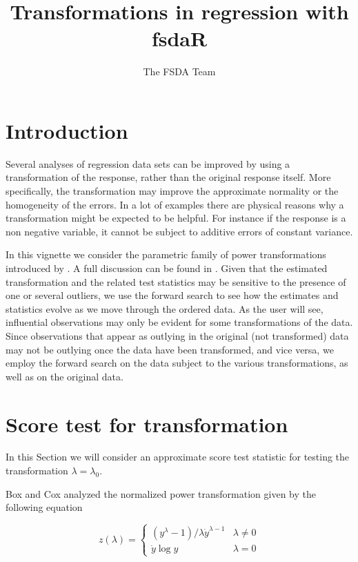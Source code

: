 \documentclass[article,shortnames,nojss]{jss}
\author{The FSDA Team}
\title{Transformations in regression with fsdaR}
\begin{document}

\section[Introduction]{Introduction}
Several analyses of regression data sets can be improved by using a transformation of the response, rather than the original response itself. More specifically, the transformation may improve the approximate normality or the homogeneity of the errors. In a lot of examples there are physical reasons why a transformation might be expected to be helpful. For instance if the response is a non negative variable, it cannot be subject to additive errors of constant variance.

In this vignette we consider the parametric family of power transformations introduced by \citet{box:1964}. A full discussion can be found in \citet{atkinson:2000}. Given that the estimated transformation and the related test statistics may be sensitive to the presence of one or several outliers, we use the forward search to see how the estimates and statistics evolve as we move through the ordered data. As the user will see, influential observations may only be evident for some transformations of the data. Since observations that appear as outlying in the original (not transformed) data may not be outlying once the data have been transformed, and vice versa, we employ the forward search on the data subject to the various transformations, as well as on the original data.

\section{Score test for transformation}
In this Section we will consider an approximate score test statistic for testing the transformation $\lambda=\lambda_0$.

Box and Cox \citep{box:1964} analyzed the normalized power transformation given by the following equation

\begin{equation}
\label{eq:1}
    z(\lambda)  = \begin{cases}
      (y^\lambda-1)/\lambda \dot{y}^{\lambda-1} & \text{$\lambda \neq 0$}\\
      \dot{y} \log y & \text{$\lambda = 0$}
    \end{cases}
    \tag{1}
\end{equation}
\end{document}
